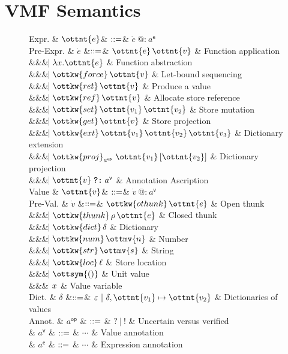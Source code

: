 \section{VMF Semantics}

\begin{figure}
\begin{grammar}
  Expr.     & $\ottnt{e}$& $\mathrel{::=}$& $ \dot{e} ~\texttt{@:}~ a^\textsf{e} $
  \\
  Pre-Expr. & $\dot{e}$
  &$\mathrel{::=}$&
  $\ottnt{e} \, \ottnt{v}$ & Function application
  \\ &&& $\bnfaltbrk  \lambda  x .  \ottnt{e} $ & Function abstraction
  \\ &&& $\bnfaltbrk \ottkw{force} \, \ottnt{v}$ & Let-bound sequencing
  \\ &&& $\bnfaltbrk \ottkw{ret} \, \ottnt{v}$ & Produce a value
  \\ &&& $\bnfaltbrk \ottkw{ref} \, \ottnt{v}$ & Allocate store reference
  \\ &&& $\bnfaltbrk \ottkw{set} \, \ottnt{v_{{\mathrm{1}}}} \, \ottnt{v_{{\mathrm{2}}}}$ & Store mutation
  \\ &&& $\bnfaltbrk \ottkw{get} \, \ottnt{v}$ & Store projection
  \\ &&& $\bnfaltbrk \ottkw{ext} \, \ottnt{v_{{\mathrm{1}}}} \, \ottnt{v_{{\mathrm{2}}}} \, \ottnt{v_{{\mathrm{3}}}}$ & Dictionary extension
  \\ &&& $\bnfaltbrk  \ottkw{proj} _{ a^{\textsf{op} } }~ \ottnt{v_{{\mathrm{1}}}} \left[  \ottnt{v_{{\mathrm{2}}}}  \right] $ & Dictionary projection
  \\ &&& $\bnfaltbrk \ottnt{v}  \mathrel{ \texttt{?:} }  a^\textsf{v}$ & Annotation Ascription
  \\[2px]
  Value    & $\ottnt{v}$& $\mathrel{::=}$& $ \dot{v} ~\texttt{@:}~ a^\textsf{v} $
  \\
  Pre-Val. & $\dot{v}$
  &$\mathrel{::=}$&        $\ottkw{othunk} \, \ottnt{e}$    & Open thunk
  \\ &&& $\bnfaltbrk \ottkw{thunk} \, \rho \, \ottnt{e}$ & Closed thunk
  \\ &&& $\bnfaltbrk \ottkw{dict} \, \delta$  & Dictionary
  \\ &&& $\bnfaltbrk \ottkw{num} \, \ottmv{n}$ & Number
  \\ &&& $\bnfaltbrk \ottkw{str} \, \ottmv{s}$ & String
  \\ &&& $\bnfaltbrk \ottkw{loc} \, \ell$ & Store location
  \\ &&& $\bnfaltbrk \ottsym{()}$    & Unit value
  \\ &&& $\hspace{-1.02ex}\mathrel{\mid} x$     & Value variable
  \\
  Dict. & $\delta$
  &$\mathrel{::=}$& $\varepsilon~|~ \delta  ,  \ottnt{v_{{\mathrm{1}}}}  \mapsto  \ottnt{v_{{\mathrm{2}}}} $ & Dictionaries of values
  \\
  Annot.
    & $a^{\textsf{op} }$ & $\mathrel{::=}$ & $ \texttt{?} ~|~ \texttt{!} $ & Uncertain versus verified
  \\
    & $a^\textsf{v}$ & $\mathrel{::=}$ & $\cdots$ & Value annotation
  \\
    & $a^\textsf{e}$ & $\mathrel{::=}$ & $\cdots$ & Expression annotation


\end{grammar}
\end{figure}
